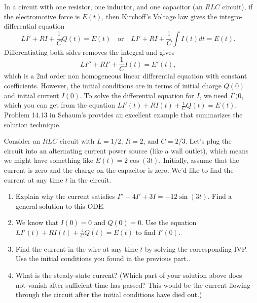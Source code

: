 In a circuit  with one resistor, one inductor, and one capacitor (an $RLC$ circuit), if the electromotive force is $E(t)$, then Kirchoff's Voltage law gives the integro-differential equation 
$$L I'+ RI+ \frac{1}{C}Q(t) =E(t) \quad \text{or}\quad L I'+ RI+ \frac{1}{C}\int I(t) dt = E(t).$$  
Differentiating both sides removes the integral and gives
$$L I''+ RI'+ \frac{1}{C}I(t) = E'(t),$$ which is a 2nd order non homogeneous linear differential equation with constant coefficients. However, the initial conditions are in terms of initial charge $Q(0)$ and initial current $I(0)$. To solve the differential equation for $I$, we need $I'(0$, which you can get from the equation $ L I'(t)+ RI(t)+ \frac{1}{C}Q(t) =E(t)$. Problem 14.13 in Schaum's provides an excellent example that summarizes the solution technique.
 
\begin{problem}
Consider an $RLC$ circuit with $L=1/2$, $R=2$, and $C=2/3$. Let's plug the circuit into an alternating current power source (like a wall outlet), which means we might have something like $E(t) = 2\cos(3t)$.  Initially, assume that the current is zero and the charge on the capacitor is zero. We'd like to find the current at any time $t$ in the circuit.
\begin{enumerate}
 \item Explain why the current satisfies $I''+4I'+3I=-12\sin(3t)$. Find a general solution to this ODE.
 \item We know that $I(0)=0$ and $Q(0)=0$.  Use the equation $L I'(t)+ RI(t)+ \frac{1}{C}Q(t) =E(t)$ to find $I'(0)$. 
 \item Find the current in the wire at any time $t$ by solving the corresponding IVP. Use the initial conditions you found in the previous part..
 \item What is the steady-state current? (Which part of your solution above does not vanish after sufficient time has passed? This would be the current flowing through the circuit after the initial conditions have died out.)
\end{enumerate}
\end{problem}

